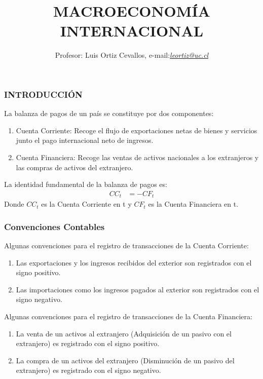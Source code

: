 \documentclass[10pt, xcolor=table, x11names]{beamer}
\author[Luis Ortiz Cevallos e-mail: \href{leortiz@uc.cl}{\textit{leortiz@uc.cl}}]{Profesor: Luis Ortiz Cevallos, e-mail:\href{leortiz@uc.cl}{\textit{leortiz@uc.cl}} }
\title[MACRO INTERNACIONAL]{\vspace*{1.0em} MACROECONOMÍA INTERNACIONAL}
\date[\href{https://ortiz-cevallos.github.io/luisortiz.github.io/ }{\textit{https://ortiz-cevallos.github.io/luisortiz.github.io/}}]{}
\begin{document}
\begin{frame}
\titlepage
\end{frame}




\begin{frame}[label=INTRODUCCION]
	\frametitle{{\normalsize INTRODUCCIÓN} {}}
	La balanza de pagos de un país se constituye por dos componentes:
	\begin{enumerate}
		\item Cuenta Corriente: Recoge el flujo de exportaciones netas de bienes y servicios junto el pago internacional neto de ingresos.
		\item Cuenta Financiera: Recoge las ventas de activos nacionales a los extranjeros y las compras de activos del extranjero.
	\end{enumerate}
	La identidad fundamental de la balanza de pagos es:
	\begin{align}
	CC_{t}&=-CF_{t}
	\end{align}
	Donde $CC_{t}$ es la Cuenta Corriente en t y $CF_{t}$ es la Cuenta Financiera en t.
\end{frame}

\begin{frame}[label=Convenciones Contables]
	\frametitle{{\normalsize Convenciones Contables} {}}
		Algunas convenciones para el registro de transacciones de la Cuenta Corriente:
		\begin{enumerate}
			\item Las exportaciones y los ingresos recibidos del exterior son registrados con el signo positivo.
			\item Las importaciones como los ingresos pagados al exterior son registrados con el signo negativo.
		\end{enumerate}
			Algunas convenciones para el registro de transacciones de la Cuenta Financiera:
			\begin{enumerate}
				\item La venta de un activos al extranjero (Adquisición de un pasivo con el extranjero) es registrado con el signo positivo.
				\item La compra de un activos del extranjero (Disminución de un pasivo del extranjero) es registrado con el signo negativo. 
			\end{enumerate}
	\end{frame}
	
\end{document}
